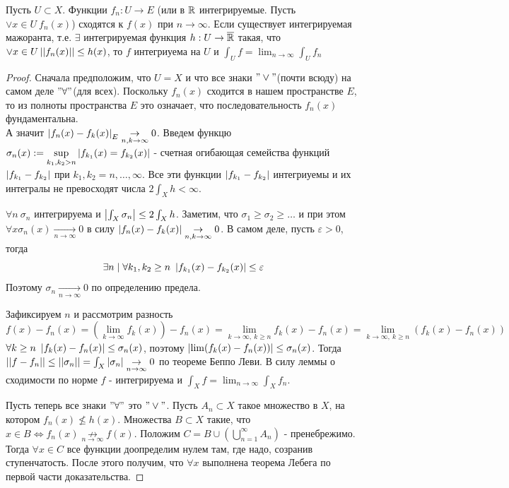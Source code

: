 \begin{theorem*}
    Пусть $U \subset X$. Функции $f_n: U \to E$ (или в $\mathbb{R}$ интегрируемые. Пусть $\vee x \in U \ f_n(x)$) сходятся к $f(x)$ при $n \to \infty$. Если существует интегрируемая мажоранта, т.е. $\exists $ интегрируемая функция $h: U \to \overline{\mathbb{R}}$ такая, что $\vee x \in U \left| \left|  f_n(x) \right| \right| \le h(x)$, то $f$ интегриуема на $U$ и $\int_U f = \lim_{n \to \infty} \int_U f_n $
    \begin{proof}
        Сначала предположим, что $U = X$ и что все знаки $"\vee"$(почти всюду) на самом деле $"\forall"$(для всех). Поскольку $f_n(x)$ сходится в нашем пространстве $E$, то из полноты пространства $E$ это означает, что последовательность $f_n(x)$ фундаментальна. \\ А значит $\left| f_n(x) - f_k(x) \right|_E \underset{n,k \to \infty}{\to} 0$.
        Введем функцю $\sigma_n(x):= \underset{k_1, k_2 > n}{\sup}\left| f_{k_1}(x) = f_{k_2}(x) \right|$ - счетная огибающая семейства функций $\left| f_{k_1} - f_{k_2} \right|$ при $k_1, k_2 = n, \hdots, \infty$.
        Все эти функции $\left| f_{k_1} - f_{k_2} \right|$ интегриуемы и их интегралы не превосходят числа $2\int_X h < \infty$. 
        \par
        $\forall n \ \sigma_n$ интегрируема и $\left| \int_X \sigma_n \right| \le 2\int_X h$. Заметим, что $\sigma_1 \ge \sigma_2 \ge \hdots$ и при этом $\forall x \sigma_n(x) \underset{n \to \infty}{\to} 0$ в силу $\left| f_n(x) - f_k(x) \right| \underset{n,k \to \infty}{\to} 0$. В самом деле, пусть $\varepsilon > 0$, тогда
        \[\exists n \mid \forall k_1, k_2 \ge n \ \left| f_{k_1}(x) - f_{k_2}(x) \right| \le \varepsilon\]
        Поэтому $\sigma_n \underset{n \to \infty}{\to} 0$ по определению предела. 
        \par
        Зафиксируем $n$ и рассмотрим разность 
        \[f(x) - f_n(x) = (\lim_{k\to\infty} f_k(x)) - f_n(x) = \lim_{k \to \infty,\ k \ge n} f_k(x) - f_n(x) = \lim_{k \to \infty, \ k \ge n}(f_k(x) - f_n(x))\]
        $\forall k \ge n \ \left| f_k(x) - f_n(x) \right| \le \sigma_n(x)$, поэтому $\left| \lim (f_k(x) - f_n(x)) \right| \le \sigma_n(x)$.
        Тогда $\left| \left|  f - f_n \right| \right| \le \left| \left|  \sigma_n \right| \right| = \int_X \left| \sigma_n \right| \underset{n \to \infty}{\to} 0$ по теореме Беппо Леви. В силу леммы о сходимости по норме $f$ - интегрируема и $\int_X f = \lim_{n\to \infty}\int_X f_n$.
        \par
        Пусть теперь все знаки $"\forall"$ это $"\vee"$. Пусть $A_n \subset X$ такое множество в $X$, на котором $f_n(x) \not\le h(x)$. Множества $B \subset X$ такие, что $x \in B \iff f_n(x) \underset{n \to \infty}{\not\to} f(x)$. Положим $C = B \cup (\bigcup_{n=1}^\infty A_n)$ - пренебрежимо. Тогда $\forall x \in C$ все функции доопределим нулем там, где надо, созранив ступенчатость. После этого получим, что $\forall x$ выполнена теорема Лебега по первой части доказательства.
    \end{proof}
\end{theorem*}

